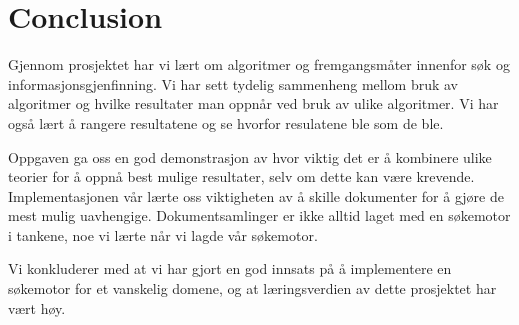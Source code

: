 \section{Conclusion}
\label{sec:conclusion}

Gjennom prosjektet har vi lært om algoritmer og fremgangsmåter innenfor søk og informasjonsgjenfinning. Vi har sett tydelig sammenheng mellom bruk av algoritmer og hvilke resultater man oppnår ved bruk av ulike algoritmer. Vi har også lært å rangere resultatene og se hvorfor resulatene ble som de ble. 

Oppgaven ga oss en god demonstrasjon av hvor viktig det er å kombinere ulike teorier for å oppnå best mulige resultater, selv om dette kan være krevende. Implementasjonen vår lærte oss viktigheten av å skille dokumenter for å gjøre de mest mulig uavhengige. Dokumentsamlinger er ikke alltid laget med en søkemotor i tankene, noe vi lærte når vi lagde vår søkemotor. 

Vi konkluderer med at vi har gjort en god innsats på å implementere en søkemotor for et vanskelig domene, og at læringsverdien av dette prosjektet har vært høy.
